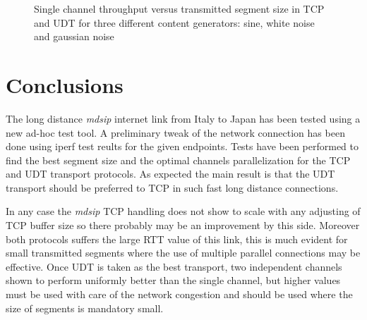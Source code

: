 \documentclass[10pt,a4paper]{article}
\begin{document}
\begin{figure}[ht]
\centerline{
}
\caption[]
{ Single channel throughput versus transmitted segment size in TCP and UDT for three different content generators: sine, white noise and gaussian noise }
\label{fig:content}
\end{figure}



\section{Conclusions}

The long distance \emph{mdsip} internet link from Italy to Japan has been tested using a new ad-hoc test tool.
A preliminary tweak of the network connection has been done using iperf test reults for the given endpoints.
Tests have been performed to find the best segment size and the optimal channels parallelization for the TCP and UDT transport protocols.
As expected the main result is that the UDT transport should be preferred to TCP in such fast long distance connections.

In any case the \emph{mdsip} TCP handling does not show to scale with any adjusting of TCP buffer size so there probably may be an improvement by this side.
Moreover both protocols suffers the large RTT value of this link, this is much evident for small transmitted segments where the use of multiple parallel connections may be effective.
Once UDT is taken as the best transport, two independent channels shown to perform uniformly better than the single channel, but higher values must be used with care of the network congestion and should be used where the size of segments is mandatory small.
\end{document}
